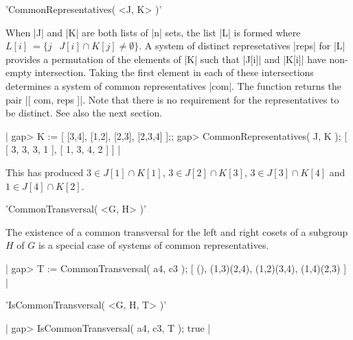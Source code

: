 %

'CommonRepresentatives( <J, K> )'

When |J| and |K| are  both lists of  |n| sets, the  list |L| is formed
where   $L[i] \:= \{ j   \;\:\; J[i] \cap K[j]  \ne  \emptyset \}$.  A
system  of    distinct represetatives  |reps|  for  |L|    provides  a
permutation of the elements  of |K| such  that |J[i]| and  |K[i]| have
non-empty intersection.   Taking the  first element  in each of  these
intersections determines   a system of common   representatives |com|.
The function returns the pair |[ com, reps ]|.   Note that there is no
requirement for the representatives to be distinct.  See also the next
section.

|   gap> K := [ [3,4], [1,2], [2,3], [2,3,4] ];;
    gap> CommonRepresentatives( J, K );
    [ [ 3, 3, 3, 1 ], [ 1, 3, 4, 2 ] ]  |

This has produced
$3 \in J[1] \cap K[1]$, $3 \in J[2] \cap K[3]$,
$3 \in J[3] \cap K[4]$  and  $1 \in J[4] \cap K[2]$.


'CommonTransversal( <G, H> )'

The existence of a common transversal for the left and right cosets of
a  subgroup $H$ of  $G$   is a   special  case of  systems of   common
representatives.

|    gap> T := CommonTransversal( a4, c3 );
    [ (), (1,3)(2,4), (1,2)(3,4), (1,4)(2,3) ]   |

%

'IsCommonTransversal( <G, H, T> )'

|    gap> IsCommonTransversal( a4, c3, T );
    true  |
    


